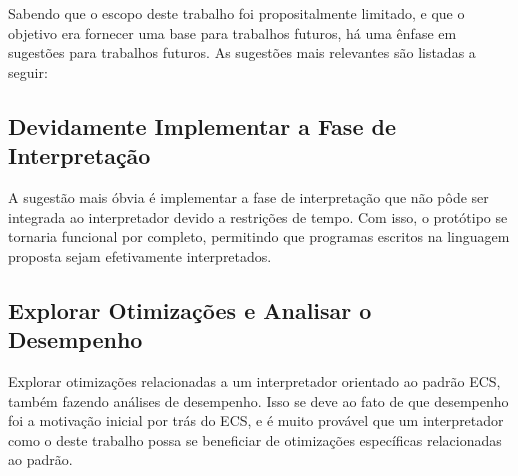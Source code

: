 




Sabendo que o escopo deste trabalho foi propositalmente limitado, e que o objetivo era fornecer uma base para trabalhos futuros, há uma ênfase em sugestões para trabalhos futuros. As sugestões mais relevantes são listadas a seguir:

\subsection{Devidamente Implementar a Fase de Interpretação}

A sugestão mais óbvia é implementar a fase de interpretação que não pôde ser integrada ao interpretador devido a restrições de tempo. Com isso, o protótipo se tornaria funcional por completo, permitindo que programas escritos na linguagem proposta sejam efetivamente interpretados.

\subsection{Explorar Otimizações e Analisar o Desempenho}

Explorar otimizações relacionadas a um interpretador orientado ao padrão ECS, também fazendo análises de desempenho. Isso se deve ao fato de que desempenho foi a motivação inicial por trás do ECS, e é muito provável que um interpretador como o deste trabalho possa se beneficiar de otimizações específicas relacionadas ao padrão.

